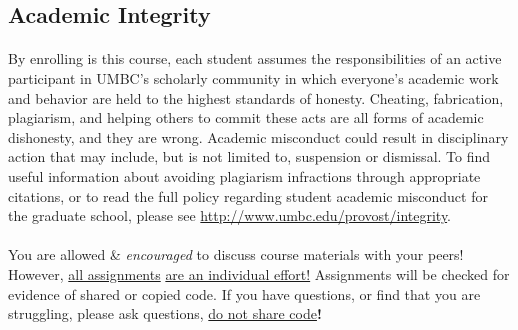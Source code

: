 \documentclass[letter,10pt]{article}
\begin{document}
\subsection*{Academic Integrity}
\paragraph{}By enrolling is this course, each student assumes the responsibilities of an active participant in UMBC's scholarly community in which everyone's academic work and behavior are held to the highest standards of honesty. Cheating, fabrication, plagiarism, and helping others to commit these acts are all forms of academic dishonesty, and they are wrong. Academic misconduct could result in disciplinary action that may include, but is not limited to, suspension or dismissal. To find useful information about avoiding plagiarism infractions through appropriate citations, or to read the full policy regarding student academic misconduct for the graduate school, please see \url{http://www.umbc.edu/provost/integrity}.

\paragraph{}You are allowed \& \textit{encouraged} to discuss course materials with your peers! However, \underline{all assignments} \underline{are an individual effort!} Assignments will be checked for evidence of shared or copied code. If you have questions, or find that you are struggling, please ask questions, \underline{do not share code}\textbf{!}
\end{document}
